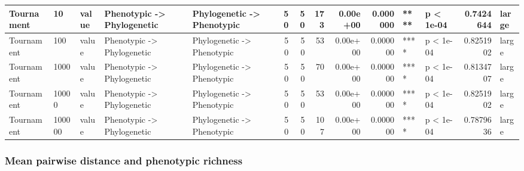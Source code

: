 \documentclass[]{book}
\begin{document}
\begin{table}
\begin{tabular}[t]{l|l|l|l|l|r|r|r|r|r|l|l|r|l}
Tournament & 10 & value & Phenotypic
    ->
Phylogenetic & Phylogenetic
    ->
Phenotypic & 50 & 50 & 173 & 0.00e+00 & 0.000000 & **** & p < 1e-04 & 0.7424644 & large\\
\hline
Tournament & 100 & value & Phenotypic
    ->
Phylogenetic & Phylogenetic
    ->
Phenotypic & 50 & 50 & 53 & 0.00e+00 & 0.000000 & **** & p < 1e-04 & 0.8251902 & large\\
\hline
Tournament & 1000 & value & Phenotypic
    ->
Phylogenetic & Phylogenetic
    ->
Phenotypic & 50 & 50 & 70 & 0.00e+00 & 0.000000 & **** & p < 1e-04 & 0.8134707 & large\\
\hline
Tournament & 10000 & value & Phenotypic
    ->
Phylogenetic & Phylogenetic
    ->
Phenotypic & 50 & 50 & 53 & 0.00e+00 & 0.000000 & **** & p < 1e-04 & 0.8251902 & large\\
\hline
Tournament & 100000 & value & Phenotypic
    ->
Phylogenetic & Phylogenetic
    ->
Phenotypic & 50 & 50 & 107 & 0.00e+00 & 0.000000 & **** & p < 1e-04 & 0.7879636 & large\\
\hline
\end{tabular}
\end{table}

\hypertarget{mean-pairwise-distance-and-phenotypic-richness}{%
\subsubsection{Mean pairwise distance and phenotypic richness}\label{mean-pairwise-distance-and-phenotypic-richness}}
\end{document}
